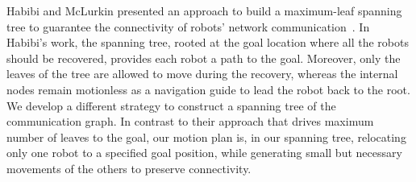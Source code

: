 Habibi and McLurkin presented an approach to build a maximum-leaf
spanning tree to guarantee the connectivity of robots' network
communication~\cite{HabMcL14}.
%
In Habibi's work, the spanning tree, rooted at the goal location where
all the robots should be recovered, provides each robot a path to the
goal. 
%
Moreover, only the leaves of the tree are allowed to move during
the recovery, whereas the internal nodes remain motionless as a
navigation guide to lead the robot back to the root.
%
We develop a different strategy to construct a spanning tree of the communication
graph. 
%
In contrast to their approach that drives maximum number of leaves to
the goal, our motion plan is, in our spanning tree, 
relocating only one robot to a specified goal position, 
while generating small but
necessary movements of the others to preserve connectivity.



